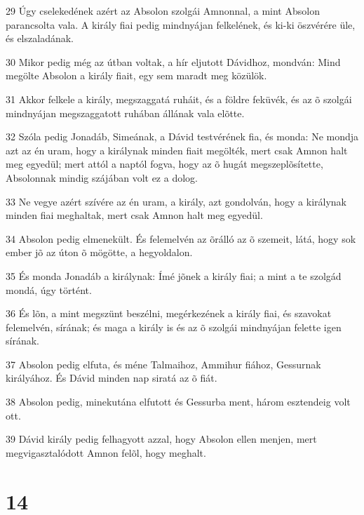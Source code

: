 \par 29 Úgy cselekedének azért az Absolon szolgái Amnonnal, a mint Absolon parancsolta vala. A király fiai pedig mindnyájan felkelének, és ki-ki öszvérére üle, és elszaladának.
\par 30 Mikor pedig még az útban voltak, a hír eljutott Dávidhoz, mondván: Mind megölte Absolon a király fiait, egy sem maradt meg közülök.
\par 31 Akkor felkele a király, megszaggatá ruháit, és a földre feküvék, és az õ szolgái mindnyájan megszaggatott ruhában állának vala elõtte.
\par 32 Szóla pedig Jonadáb, Simeának, a Dávid testvérének fia, és monda: Ne mondja azt az én uram, hogy a királynak minden fiait megölték, mert csak Amnon halt meg egyedül; mert attól a naptól fogva, hogy az õ hugát megszeplõsítette, Absolonnak mindig szájában volt ez a dolog.
\par 33 Ne vegye azért szívére az én uram, a király, azt gondolván, hogy a királynak minden fiai meghaltak, mert csak Amnon halt meg egyedül.
\par 34 Absolon pedig elmenekült. És felemelvén az õrálló az õ szemeit, látá, hogy sok ember jõ az úton õ mögötte, a hegyoldalon.
\par 35 És monda Jonadáb a királynak: Ímé jõnek a király fiai; a mint a te szolgád mondá, úgy történt.
\par 36 És lõn, a mint megszünt beszélni, megérkezének a király fiai, és szavokat felemelvén, sírának; és maga a király is és az õ szolgái mindnyájan felette igen sírának.
\par 37 Absolon pedig elfuta, és méne Talmaihoz, Ammihur fiához, Gessurnak királyához. És Dávid minden nap siratá az õ fiát.
\par 38 Absolon pedig, minekutána elfutott és Gessurba ment, három esztendeig volt ott.
\par 39 Dávid király pedig felhagyott azzal, hogy Absolon ellen menjen, mert megvigasztalódott Amnon felõl, hogy meghalt.

\chapter{14}

